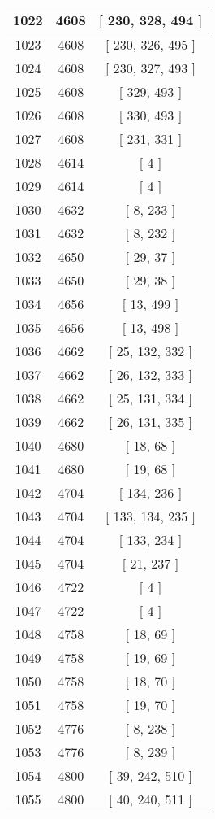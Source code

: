 \begin{center}
\begin{longtable}[H]{|| c c c ||}
\hline
1022 & 4608 & [ 230, 328, 494 ] \\ 
\hline
1023 & 4608 & [ 230, 326, 495 ] \\ 
\hline
1024 & 4608 & [ 230, 327, 493 ] \\ 
\hline
1025 & 4608 & [ 329, 493 ] \\ 
\hline
1026 & 4608 & [ 330, 493 ] \\ 
\hline
1027 & 4608 & [ 231, 331 ] \\ 
\hline
1028 & 4614 & [ 4 ] \\ 
\hline
1029 & 4614 & [ 4 ] \\ 
\hline
1030 & 4632 & [ 8, 233 ] \\ 
\hline
1031 & 4632 & [ 8, 232 ] \\ 
\hline
1032 & 4650 & [ 29, 37 ] \\ 
\hline
1033 & 4650 & [ 29, 38 ] \\ 
\hline
1034 & 4656 & [ 13, 499 ] \\ 
\hline
1035 & 4656 & [ 13, 498 ] \\ 
\hline
1036 & 4662 & [ 25, 132, 332 ] \\ 
\hline
1037 & 4662 & [ 26, 132, 333 ] \\ 
\hline
1038 & 4662 & [ 25, 131, 334 ] \\ 
\hline
1039 & 4662 & [ 26, 131, 335 ] \\ 
\hline
1040 & 4680 & [ 18, 68 ] \\ 
\hline
1041 & 4680 & [ 19, 68 ] \\ 
\hline
1042 & 4704 & [ 134, 236 ] \\ 
\hline
1043 & 4704 & [ 133, 134, 235 ] \\ 
\hline
1044 & 4704 & [ 133, 234 ] \\ 
\hline
1045 & 4704 & [ 21, 237 ] \\ 
\hline
1046 & 4722 & [ 4 ] \\ 
\hline
1047 & 4722 & [ 4 ] \\ 
\hline
1048 & 4758 & [ 18, 69 ] \\ 
\hline
1049 & 4758 & [ 19, 69 ] \\ 
\hline
1050 & 4758 & [ 18, 70 ] \\ 
\hline
1051 & 4758 & [ 19, 70 ] \\ 
\hline
1052 & 4776 & [ 8, 238 ] \\ 
\hline
1053 & 4776 & [ 8, 239 ] \\ 
\hline
1054 & 4800 & [ 39, 242, 510 ] \\ 
\hline
1055 & 4800 & [ 40, 240, 511 ] \\ 

\end{longtable}
\end{center}
